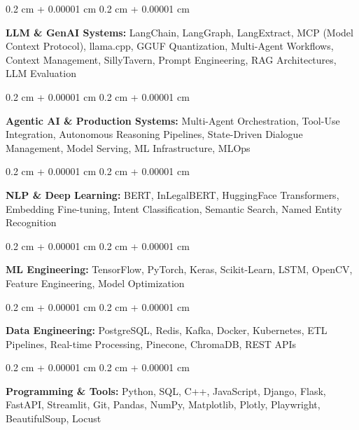 \documentclass[10pt, letterpaper]{article}
\newenvironment{onecolentry}{
    \begin{adjustwidth}{
        0.2 cm + 0.00001 cm
    }{
        0.2 cm + 0.00001 cm
    }
}{
    \end{adjustwidth}
}
\begin{document}
    \begin{onecolentry}
        \textbf{LLM \& GenAI Systems:} LangChain, LangGraph, LangExtract, MCP (Model Context Protocol), llama.cpp, GGUF Quantization, Multi-Agent Workflows, Context Management, SillyTavern, Prompt Engineering, RAG Architectures, LLM Evaluation
    \end{onecolentry}
    
    \vspace{0.2 cm}

    \begin{onecolentry}
        \textbf{Agentic AI \& Production Systems:} Multi-Agent Orchestration, Tool-Use Integration, Autonomous Reasoning Pipelines, State-Driven Dialogue Management, Model Serving, ML Infrastructure, MLOps
    \end{onecolentry}
    
    \vspace{0.2 cm}

    \begin{onecolentry}
        \textbf{NLP \& Deep Learning:} BERT, InLegalBERT, HuggingFace Transformers, Embedding Fine-tuning, Intent Classification, Semantic Search, Named Entity Recognition
    \end{onecolentry}
    
    \vspace{0.2 cm}
    
    \begin{onecolentry}
        \textbf{ML Engineering:} TensorFlow, PyTorch, Keras, Scikit-Learn, LSTM, OpenCV, Feature Engineering, Model Optimization
    \end{onecolentry}
    
    \vspace{0.1 cm}

    \begin{onecolentry}
        \textbf{Data Engineering:} PostgreSQL, Redis, Kafka, Docker, Kubernetes, ETL Pipelines, Real-time Processing, Pinecone, ChromaDB, REST APIs
    \end{onecolentry}
    
    \vspace{0.1 cm}
    
    \begin{onecolentry}
        \textbf{Programming \& Tools:} Python, SQL, C++, JavaScript, Django, Flask, FastAPI, Streamlit, Git, Pandas, NumPy, Matplotlib, Plotly, Playwright, BeautifulSoup, Locust
    \end{onecolentry}
\vspace{0.3 cm}
\end{document}
